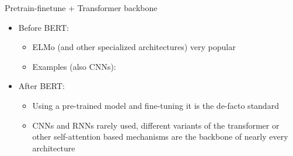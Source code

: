 \begin{frame}{Pretrain-finetune + Transformer backbone}

\vfill

	\begin{itemize}
		\item Before BERT: 
			\begin{itemize}
				\item ELMo (and other specialized architectures) very popular
				\item Examples (also CNNs): 
							\href{https://arxiv.org/abs/1408.5882}{} 
							\href{https://proceedings.neurips.cc/paper/2015/file/250cf8b51c773f3f8dc8b4be867a9a02-Paper.pdf}{}
			\end{itemize}
		\item After BERT:
			\begin{itemize}
				\item Using a pre-trained model and fine-tuning it is the de-facto standard
				\item CNNs and RNNs rarely used, different variants of the transformer or other self-attention based mechanisms are the backbone of nearly every architecture
			\end{itemize}
	\end{itemize}

\vfill

\end{frame}


